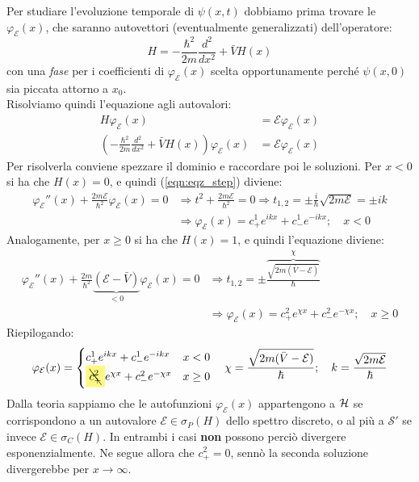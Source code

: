 \documentclass[../../FisicaTeorica.tex]{subfiles}
\begin{document}
Per studiare l'evoluzione temporale di $\psi(x,t)$ dobbiamo prima trovare le $\varphi_\mathcal{E}(x)$, che saranno autovettori (eventualmente generalizzati) dell'operatore:
\[
H=-\frac{\hbar^2}{2m}\frac{d^2}{dx^2}+\bar{V}H(x)
\]
con una \textit{fase} per i coefficienti di $\varphi_\mathcal{E}(x)$ scelta opportunamente perché $\psi(x,0)$ sia piccata attorno a $x_0$.\\

Risolviamo quindi l'equazione agli autovalori:
\begin{align}
H\varphi_\mathcal{E}(x)&=\mathcal{E}\varphi_\mathcal{E}(x)\nonumber \\
\left(-\frac{\hbar^2}{2m} \frac{d^2}{dx^2}+\bar{V}H(x)\right)\varphi_{\mathcal{E}}(x)&=\mathcal{E}\varphi_\mathcal{E}(x)
\label{eqn:eqz_step}
\end{align}
Per risolverla conviene spezzare il dominio e raccordare poi le soluzioni. Per $x<0$ si ha che $H(x)=0$, e quindi (\ref{eqn:eqz_step}) diviene:
\begin{align}
\varphi_{\mathcal{E}}''(x)+\frac{2m\mathcal{E}}{\hbar^2}\varphi_\mathcal{E}(x)=0 &\Rightarrow t^2 + \frac{2m\mathcal{E}}{\hbar^2}=0\Rightarrow t_{1,2}=\pm\frac{i}{\hbar}\sqrt{2m\mathcal{E}}=\pm ik
\nonumber
\\
&\Rightarrow \varphi_{\mathcal{E}}(x)=c_+^1 e^{ikx}+c_-^1 e^{-ikx}; \quad x < 0
\label{eqn:conti_negativi}
\end{align} 
Analogamente, per $x\geq 0$ si ha che $H(x)=1$, e quindi l'equazione diviene:
\begin{align}
\varphi_{\mathcal{E}}''(x)+\frac{2m}{\hbar^2}\underbrace{(\mathcal{E}-\bar{V})}_{<0}\varphi_\mathcal{E}(x)=0 &\Rightarrow t_{1,2}=\pm \overbrace{\frac{\sqrt{2m(\bar{V}-\mathcal{E})}}{\hbar}}^{\chi}
\nonumber
\\
&\Rightarrow \varphi_\mathcal{E}(x)=c^2_+e^{\chi x}+c_-^2e^{-\chi x};\quad x\geq 0
\label{eqn:conti_positivi}
\end{align}
Riepilogando: 
\begin{equation}
\varphi_\mathcal{E}(x) = 
\begin{cases}
c^1_+ e^{ikx} + c^1_- e^{-ikx} & x<0\\
\hlc{Yellow}{\bcancel{c^2_+}}e^{\chi x} + c^2_- e^{-\chi x} & x\geq0
\end{cases} \quad \chi=\frac{\sqrt{2m(\bar{V}-\mathcal{E})}}{\hbar};
\quad k=\frac{\sqrt{2m\mathcal{E}}}{\hbar}
\label{eqn:autofunzioni}
\end{equation}
Dalla teoria sappiamo che le autofunzioni $\varphi_\mathcal{E}(x)$ appartengono a $\mathcal{H}$ se corrispondono a un autovalore $\mathcal{E} \in \sigma_P(H)$ dello spettro discreto, o al più a $\mathcal{S}'$ se invece $\mathcal{E}\in\sigma_C(H)$. In entrambi i casi \textbf{non} possono perciò divergere esponenzialmente. Ne segue allora che $c^2_+ = 0$, sennò la seconda soluzione divergerebbe per $x\to\infty$.\\
\end{document}
